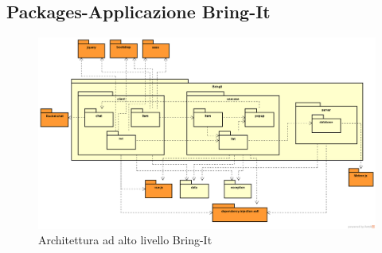 \subsection{Packages-Applicazione Bring-It}
\label{Architettura ad alto livello-BringIt}
\begin{figure}[H]
	\centering
	\includegraphics[width=\textwidth]{Sezioni/Packages/App/pck_application.png}
	\caption{Architettura ad alto livello Bring-It}
\end{figure}
